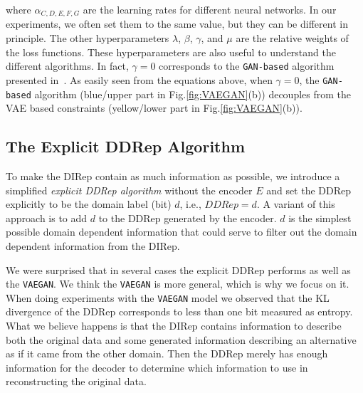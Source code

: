\documentclass{article}
\newcommand\todo[1]{\textcolor{red}{#1}}
\begin{document}
where $\alpha_{C,D,E,F,G}$ are the learning rates for different neural networks. In our experiments, we often set them to the same value, but they can be different in principle. %
The other hyperparameters $\lambda$, $\beta$, $\gamma$, and $\mu$ are the relative weights of the loss functions. These hyperparameters are also useful to understand the different algorithms. In fact, $\gamma=0$ corresponds to the \verb"GAN-based" algorithm presented in~\cite{singla2020preparing}. As easily seen from the equations above, when $\gamma=0$, the \verb"GAN-based" algorithm (blue/upper part in Fig.\ref{fig:VAEGAN}(b)) decouples from the VAE based constraints (yellow/lower part in Fig.\ref{fig:VAEGAN}(b)). 

\subsection{The Explicit DDRep Algorithm} To make the DIRep contain as much information as possible, we introduce a simplified \textit{explicit DDRep algorithm} without the encoder $E$ and set the DDRep explicitly to be the domain label (bit) $d$, i.e., $DDRep=d$. A variant of this approach is to add $d$ to the DDRep generated by the encoder. $d$ is the simplest possible domain dependent information that could serve to filter out the domain dependent information from the DIRep. 

We were surprised that in several cases the explicit DDRep performs as well as the \verb"VAEGAN". We think the \verb"VAEGAN" is more general, which is why we focus on it. When doing experiments with the \verb"VAEGAN" model we observed that the KL divergence of the DDRep corresponds to less than one bit measured as entropy. What we believe happens is that the DIRep contains information to describe both the original data and some generated information describing an alternative as if it came from the other domain. Then the DDRep merely has enough information for the decoder to determine which information to use in reconstructing the original data.
\end{document}
